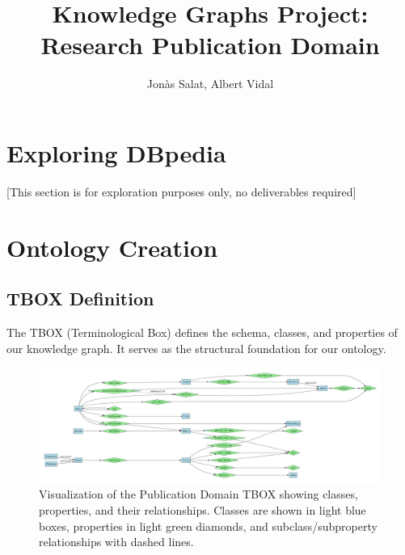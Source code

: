 \documentclass[10pt,a4paper]{article}
\title{Knowledge Graphs Project: Research Publication Domain}
\author{Jonàs Salat, Albert Vidal}
\begin{document}
\maketitle

\section{Exploring DBpedia}
[This section is for exploration purposes only, no deliverables required]

\section{Ontology Creation}
\subsection{TBOX Definition}
The TBOX (Terminological Box) defines the schema, classes, and properties of our knowledge graph. It serves as the structural foundation for our ontology.

\begin{figure}[H]
    \centering
    \includegraphics[width=\textwidth]{img/publication_tbox.pdf}
    \caption{Visualization of the Publication Domain TBOX showing classes, properties, and their relationships. Classes are shown in light blue boxes, properties in light green diamonds, and subclass/subproperty relationships with dashed lines.}
    \label{fig:tbox}
\end{figure}
\end{document}
